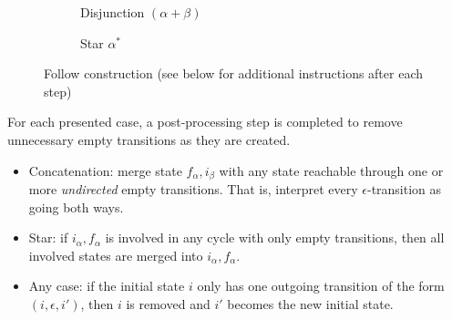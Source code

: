 \begin{figure}[H]
  \begin{subfigure}[b]{0.45\linewidth}
    \centering
    \caption{Disjunction $(\alpha + \beta)$}
  \end{subfigure}
  \begin{subfigure}[b]{0.45\linewidth}
    \centering
    \caption{Star $\alpha^*$}
  \end{subfigure}
  \caption{Follow construction (see below for additional instructions after each step)}
  \label{fig:follow construction}
\end{figure}

For each presented case, a post-processing step is completed to remove unnecessary empty transitions as they are created. 
\begin{itemize}
  \item Concatenation: merge state $f_\alpha, i_\beta$ with any state reachable through one or more \emph{undirected} empty transitions. That is, interpret every $\epsilon$-transition as going both ways.
  \item Star: if $i_\alpha, f_\alpha$ is involved in any cycle with only empty transitions, then all involved states are merged into $i_\alpha, f_\alpha$.
  \item Any case: if the initial state $i$ only has one outgoing transition of the form $(i, \epsilon, i')$, then $i$ is removed and $i'$ becomes the new initial state.
\end{itemize}


